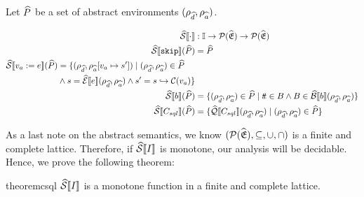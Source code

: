 Let $\widehat{P}$ be a set of abstract environments $(\rho_{\widehat{d}}, \rho_{\widehat{a}})$.

\begin{align}
    \widehat{\mathcal{S}} \llbracket \cdot \rrbracket &: \mathbb{I} \rightarrow \mathcal{P}(\widehat{\mathfrak{E}}) \rightarrow \mathcal{P}(\widehat{\mathfrak{E}}) \\
    \widehat{\mathcal{S}} \llbracket \texttt{skip} \rrbracket(\widehat{P}) &= \widehat{P} \\
    \begin{split}
        \widehat{\mathcal{S}} \llbracket v_a := e \rrbracket(\widehat{P}) &= \{(\rho_{\widehat{d}}, \rho_{\widehat{a}}[v_a \mapsto s']) \mid (\rho_{\widehat{d}}, \rho_{\widehat{a}}) \in \widehat{P} \\
        &\land s = \widehat{\mathcal{E}}\llbracket e \rrbracket(\rho_{\widehat{d}}, \rho_{\widehat{a}}) \land s' = s \hookrightarrow \mathcal{C}(v_a) \}
    \end{split}\\
    \widehat{\mathcal{S}} \llbracket b \rrbracket(\widehat{P}) &= \{ (\rho_{\widehat{d}}, \rho_{\widehat{a}}) \in \widehat{P} \mid t\!t \in B \land B \in \widehat{\mathcal{B}}\llbracket b \rrbracket(\rho_{\widehat{d}}, \rho_{\widehat{a}}) \} \\
    \widehat{\mathcal{S}} \llbracket C_{sql} \rrbracket(\widehat{P}) &= \{\widehat{\mathcal{Q}}\llbracket C_{sql} \rrbracket(\rho_{\widehat{d}}, \rho_{\widehat{a}}) \mid (\rho_{\widehat{d}}, \rho_{\widehat{a}}) \in \widehat{P} \}
\end{align}

As a last note on the abstract semantics, we know $(\mathcal{P}(\widehat{\mathfrak{E}}), \subseteq, \cup, \cap)$ is a finite and complete lattice.
Therefore, if $\widehat{\mathcal{S}} \llbracket I \rrbracket$ is monotone, our analysis will be decidable.
Hence, we prove the following theorem:
\begin{restatable}{theorem}{csql}\label{thm:csql}
    $\widehat{\mathcal{S}} \llbracket I \rrbracket$ is a monotone function in a finite and complete lattice.
\end{restatable}

